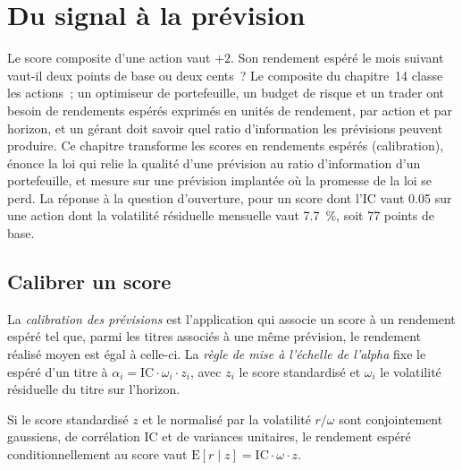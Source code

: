 \chapter{Du signal à la prévision}\label{ch:rs:from-signal-to-forecast}

Le score composite d'une action vaut $+2$. Son rendement espéré le mois suivant vaut-il deux points de base ou deux cents~? Le composite du
chapitre~14 classe les actions~; un optimiseur de portefeuille, un budget de risque et un trader ont besoin de rendements espérés exprimés en unités de rendement, par action
et par horizon, et un gérant doit savoir quel ratio d'information les prévisions peuvent produire. Ce chapitre transforme les scores en
rendements espérés (calibration), énonce la loi qui relie la qualité d'une prévision au ratio d'information d'un portefeuille, et mesure sur une
prévision implantée où la promesse de la loi se perd. La réponse à la question d'ouverture, pour un score dont l'IC vaut 0.05 sur une action dont
la volatilité résiduelle mensuelle vaut 7.7~\%, soit 77 points de base.

\section{Calibrer un score}

\begin{definition}\label{def:rs:from-signal-to-forecast:calibration}
La \emph{calibration des prévisions} est l'application qui associe un score à un rendement espéré tel que, parmi les titres
associés à une même prévision, le rendement réalisé moyen est égal à celle-ci. La \emph{règle de mise à l'échelle de l'alpha} fixe le
 espéré d'un titre à $\alpha_i = \mathrm{IC}\cdot\omega_i\cdot z_i$, avec $z_i$ le score standardisé et $\omega_i$ le
volatilité résiduelle du titre sur l'horizon.
\end{definition}

\begin{proposition}\label{prop:rs:from-signal-to-forecast:scaling}
Si le score standardisé $z$ et le  normalisé par la volatilité $r/\omega$ sont conjointement gaussiens, de corrélation $\mathrm{IC}$ et
de variances unitaires, le rendement espéré conditionnellement au score vaut $\mathrm{E}[r \mid z] = \mathrm{IC}\cdot\omega\cdot z$.
\end{proposition}

